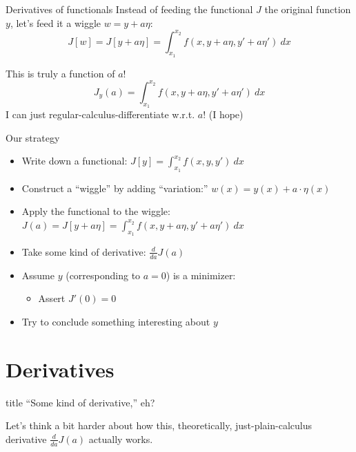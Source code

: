 \documentclass[handout]{beamer}
\begin{document}
\begin{frame}{Derivatives of functionals}
    Instead of feeding the functional $J$ the original function $y$, let's feed it a wiggle $w=y + a\eta$:
    \[J[w] = J[y+a\eta] = \int_{x_1}^{x_2}f(x, y+a\eta, y'+a\eta')\ dx\]
    
    \pause
    This is truly a \alert{function} of $a$! \pause
    \[J_y(a) = \int_{x_1}^{x_2}f(x, y+a\eta, y'+a\eta')\ dx\] \pause
    I can just regular-calculus-differentiate w.r.t. $a$! \pause (I hope)
\end{frame}

\begin{frame}{Our strategy}
\begin{itemize}
    \item Write down a functional: $J[y]=\displaystyle\int_{x_1}^{x_2}f(x, y, y')\ dx$
    \item Construct a ``wiggle'' by adding ``variation:'' $w(x) = y(x) + a\cdot\eta(x)$
    \item Apply the functional to the wiggle: $J(a) = J[y+a\eta] =\displaystyle\int_{x_1}^{x_2}f(x, y+a\eta, y'+a\eta')\ dx$
    \item Take some kind of derivative: $\frac{d}{da}J(a)$
    \item Assume $y$ (corresponding to $a=0$) is a minimizer: 
    \begin{itemize} \item Assert $J'(0)=0$ \end{itemize}
    \item Try to conclude something interesting about $y$
\end{itemize}
\end{frame}

\section*{Derivatives}
\begin{frame}
    \begin{beamercolorbox}[sep=8pt,center,shadow=true,rounded=true]{title}
     ``Some kind of derivative,'' eh?
\end{beamercolorbox}
Let's think a bit harder about how this, theoretically, just-plain-calculus derivative $\frac{d}{da} J(a)$ actually works.
\end{frame}
\end{document}
